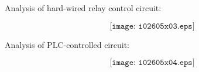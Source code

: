 





Analysis of hard-wired relay control circuit:

$$\texttt{[image: i02605x03.eps]}$$

\vfil \eject

Analysis of PLC-controlled circuit:

$$\texttt{[image: i02605x04.eps]}$$




